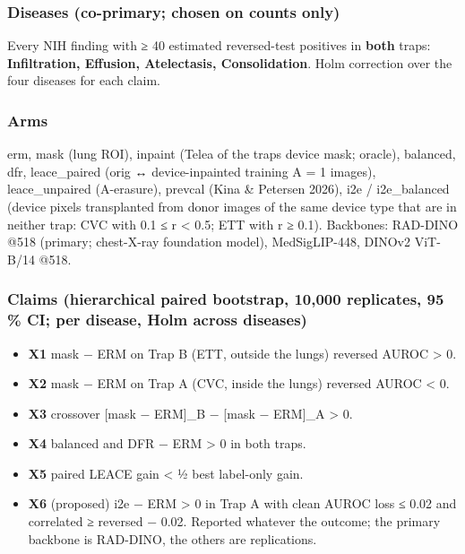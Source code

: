 {\subsubsection{Diseases (co-primary; chosen on counts only)}\label{diseases-co-primary-chosen-on-counts-only}

Every NIH finding with ≥ 40 estimated reversed-test positives in \textbf{both} traps: \textbf{Infiltration, Effusion,
Atelectasis, Consolidation}. Holm correction over the four diseases for each claim.

\subsubsection{Arms}\label{arms}

erm, mask (lung ROI), inpaint (Telea of the trap\textquotesingle s device mask; oracle), balanced, dfr, leace\_paired
(orig ↔ device-inpainted training A = 1 images), leace\_unpaired (A-erasure), prevcal (Kina \& Petersen 2026),
i2e / i2e\_balanced (device pixels transplanted from donor images of the same device type that are in neither
trap: CVC with 0.1 ≤ r \textless{} 0.5; ETT with r ≥ 0.1).
Backbones: RAD-DINO @518 (primary; chest-X-ray foundation model), MedSigLIP-448, DINOv2 ViT-B/14 @518.

\subsubsection{Claims (hierarchical paired bootstrap, 10,000 replicates, 95 \% CI; per disease, Holm across diseases)}\label{claims-hierarchical-paired-bootstrap-10000-replicates-95--ci-per-disease-holm-across-diseases}

\begin{itemize}

\item
  \textbf{X1} mask − ERM on Trap B (ETT, outside the lungs) reversed AUROC \textgreater{} 0.
\item
  \textbf{X2} mask − ERM on Trap A (CVC, inside the lungs) reversed AUROC \textless{} 0.
\item
  \textbf{X3} crossover {[}mask − ERM{]}\_B − {[}mask − ERM{]}\_A \textgreater{} 0.
\item
  \textbf{X4} balanced and DFR − ERM \textgreater{} 0 in both traps.
\item
  \textbf{X5} paired LEACE gain \textless{} ½ best label-only gain.
\item
  \textbf{X6} (proposed) i2e − ERM \textgreater{} 0 in Trap A with clean AUROC loss ≤ 0.02 and correlated ≥ reversed − 0.02.
  Reported whatever the outcome; the primary backbone is RAD-DINO, the others are replications.
\end{itemize}

}
